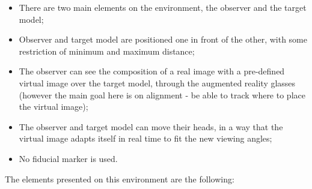 \documentclass[msc, a4paper, classic, en]{ufbathesis}
\begin{document}
\begin{itemize}
  \item There are two main elements on the environment, the observer and the target model;
  \item Observer and target model are positioned one in front of the other, with some restriction of minimum and maximum distance;
  \item The observer can see the composition of a real image with a pre-defined virtual image over the target model, through the augmented
        reality glasses (however the main goal here is on alignment - be able to track where to place the virtual image);
  \item The observer and target model can move their heads, in a way that the virtual image adapts itself in real time to fit the new
        viewing angles;
  \item No fiducial marker is used.
\end{itemize}

The elements presented on this environment are the following:
\end{document}
